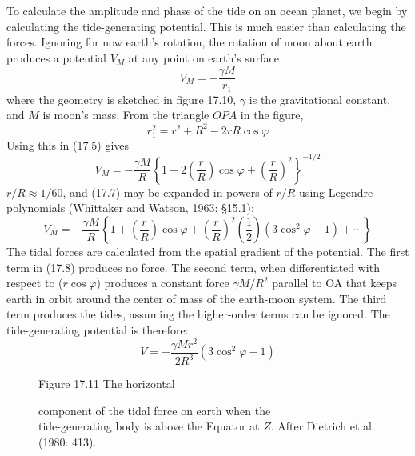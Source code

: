 To calculate the amplitude and phase of the tide on an ocean planet,
we begin by calculating the tide-generating
potential. This is much easier than calculating
the forces. Ignoring for now earth's rotation, the rotation of
moon about earth produces a potential $V_M$ at any point
on earth's surface
\begin{equation}
V_{M} = -\frac{\gamma M}{r_{1}}
\end{equation}
where the geometry is sketched in figure 17.10, $\gamma $ is the
gravitational constant, and $M$ is moon's mass. From the triangle
$OPA$ in the figure,
\begin{equation}
r_{1}^{2} = r^{2} + R^{2} - 2 r R \cos \varphi
\end{equation}
Using this in (17.5) gives
\begin{equation}
V_{M} = -\frac{\gamma M}{R} \left\{ 1 - 2 \left(\frac{r}{R}\right) \cos \varphi +
\left(\frac{r}{R}\right)^{2}\right\}^{-1/2}
\end{equation}
$r/R \approx 1/60$, and (17.7) may be expanded in powers of $r/R$
using Legendre polynomials (Whittaker and Watson, 1963: \S 15.1):
\begin{equation}
V_M = -\frac{\gamma M}{R} \left\{1+\left(\frac{r}{R}\right) \cos \varphi +
\left(\frac{r}{R}\right)^2 \left(\frac{1}{2}\right) (3\cos ^2 \varphi - 1) + \cdots
\right\}
\end{equation}
The tidal forces are calculated from the spatial gradient of the
potential. The first term in (17.8) produces no force. The second
term, when differentiated with respect to ($r \cos \varphi $) produces
a constant force $\gamma M/R^{2}$ parallel to OA that keeps earth in
orbit around the center of mass of the earth-moon system. The third
term produces the tides, assuming the higher-order terms can be
ignored. The tide-generating potential is therefore:
\begin{equation}
V= -\frac{\gamma M r^{2}}{2 R^{3}} (3 \cos ^2 \varphi - 1)
\end{equation}

\begin{figure}[t!]
\footnotesize
\centering
Figure 17.11 The horizontal \rule{0mm}{4ex}component of the tidal
force on earth when the\\tide-generating body is above the Equator at
$Z$. After Dietrich et al. (1980: 413).

\label{fig:horiztideforce}
\vspace{-3ex}
\end{figure}

